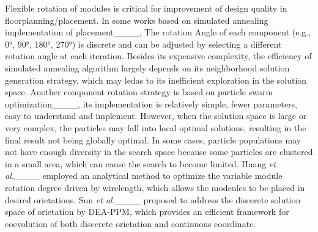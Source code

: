 





Flexible rotation of modules is critical for improvement of design quality in floorplanning/placement. In some works based on simulated annealing implementation of placement____, The rotation Angle of each component (e.g., 0°, 90°, 180°, 270°) is discrete and can be adjusted by selecting a different rotation angle at each iteration. Besides its expensive complexity, the efficiency of simulated annealing algorithm largely depends on its neighborhood solution generation strategy, which may ledas to its inefficient exploration in the solution space. Another component rotation strategy is based on particle swarm optimization____, its implementation is relatively simple, fewer parameters, easy to understand and implement. However, when the solution space is large or very complex, the particles may fall into local optimal solutions, resulting in the final result not being globally optimal. In some cases, particle populations may not have enough diversity in the search space because some particles are clustered in a small area, which can cause the search to become limited.
Huang \emph{et al.}____ employed an analytical method to optimize the variable module rotation degree driven by wirelength, which allows the modeules to be placed in desired orietations.  Sun \emph{et al.}____ proposed to address the discerete solution space of orietation by DEA-PPM, which provides an efficient framework for coevolution of both discerete orietation and continuous coordinate.

